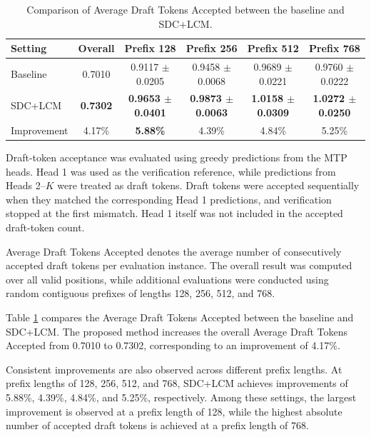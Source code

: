 \begin{table}[!htbp]
    \centering
    \caption{Comparison of Average Draft Tokens Accepted between the baseline and SDC+LCM.}
    \label{tab:draft_token_acceptance}
    \begin{tabular}{lccccc}
        \toprule[1.25pt]
        Setting
        & Overall
        & Prefix 128
        & Prefix 256
        & Prefix 512
        & Prefix 768 \\
        \midrule

        Baseline
        & 0.7010
        & 0.9117 $\pm$ 0.0205
        & 0.9458 $\pm$ 0.0068
        & 0.9689 $\pm$ 0.0221
        & 0.9760 $\pm$ 0.0222 \\

        SDC+LCM
        & \textbf{0.7302}
        & \textbf{0.9653 $\pm$ 0.0401}
        & \textbf{0.9873 $\pm$ 0.0063}
        & \textbf{1.0158 $\pm$ 0.0309}
        & \textbf{1.0272 $\pm$ 0.0250} \\

        Improvement
        & 4.17\%
        & \textbf{5.88\%}
        & 4.39\%
        & 4.84\%
        & 5.25\% \\
        \bottomrule[1.25pt]
    \end{tabular}
\end{table}

Draft-token acceptance was evaluated using greedy predictions from the
MTP heads. Head 1 was used as the verification reference, while predictions
from Heads 2--$K$ were treated as draft tokens. Draft tokens were accepted
sequentially when they matched the corresponding Head 1 predictions, and
verification stopped at the first mismatch. Head 1 itself was not included
in the accepted draft-token count.

Average Draft Tokens Accepted denotes the average number of consecutively
accepted draft tokens per evaluation instance. The overall result was computed
over all valid positions, while additional evaluations were conducted using
random contiguous prefixes of lengths 128, 256, 512, and 768.

Table \ref{tab:draft_token_acceptance} compares the Average Draft Tokens
Accepted between the baseline and SDC+LCM. The proposed method increases
the overall Average Draft Tokens Accepted from 0.7010 to 0.7302,
corresponding to an improvement of 4.17\%.

Consistent improvements are also observed across different prefix lengths.
At prefix lengths of 128, 256, 512, and 768, SDC+LCM achieves improvements
of 5.88\%, 4.39\%, 4.84\%, and 5.25\%, respectively. Among these settings,
the largest improvement is observed at a prefix length of 128, while the
highest absolute number of accepted draft tokens is achieved at a prefix
length of 768.

